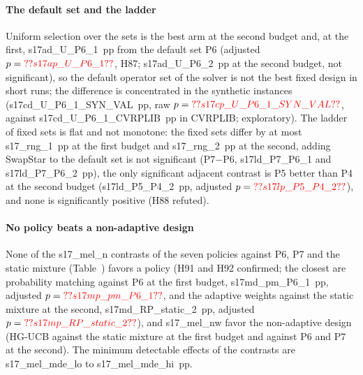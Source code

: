 \paragraph{The default set and the ladder} Uniform selection over the sets is the best arm at the second budget and, at the first, \num{s17ad_U_P6_1}~pp from the default set P6 (adjusted $p=\num{s17ap_U_P6_1}$, H87; \num{s17ad_U_P6_2}~pp at the second budget, not significant), so the default operator set of the solver is not the best fixed design in short runs; the difference is concentrated in the synthetic instances (\num{s17cd_U_P6_1_SYN_VAL}~pp, raw $p=\num{s17cp_U_P6_1_SYN_VAL}$, against \num{s17cd_U_P6_1_CVRPLIB}~pp in CVRPLIB; exploratory). The ladder of fixed sets is flat and not monotone: the fixed sets differ by at most \num{s17_rng_1}~pp at the first budget and \num{s17_rng_2}~pp at the second, adding SwapStar to the default set is not significant (P7$-$P6, \num{s17ld_P7_P6_1} and \num{s17ld_P7_P6_2}~pp), the only significant adjacent contrast is P5 better than P4 at the second budget (\num{s17ld_P5_P4_2}~pp, adjusted $p=\num{s17lp_P5_P4_2}$), and none is significantly positive (H88 refuted).

\paragraph{No policy beats a non-adaptive design} None of the \num{s17_mel_n} contrasts of the seven policies against P6, P7 and the static mixture (Table~) favors a policy (H91 and H92 confirmed; the closest are probability matching against P6 at the first budget, \num{s17md_pm_P6_1}~pp, adjusted $p=\num{s17mp_pm_P6_1}$, and the adaptive weights against the static mixture at the second, \num{s17md_RP_static_2}~pp, adjusted $p=\num{s17mp_RP_static_2}$), and \num{s17_mel_nw} favor the non-adaptive design (HG-UCB against the static mixture at the first budget and against P6 and P7 at the second). The minimum detectable effects of the contrasts are \num{s17_mel_mde_lo} to \num{s17_mel_mde_hi}~pp.



